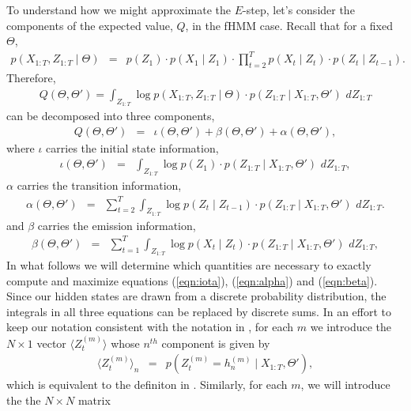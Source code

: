 \documentclass{amsart}
\begin{document}
To understand how we might approximate the $E$-step, let's consider the components of the expected value, $Q$, in the fHMM case.  Recall that for a fixed $\Theta$,  
\begin{eqnarray}\label{eqn:1}
p(X_{1:T},Z_{1:T}\mid \Theta) & = & p(Z_1)\cdot p(X_1\mid Z_1)\cdot 
\prod_{t=2}^Tp(X_t\mid Z_t)\cdot p(Z_t\mid Z_{t-1}).  
\end{eqnarray}
Therefore, 
\begin{eqnarray*}
Q(\Theta,\Theta') = \int_{Z_{1:T}}\log p(X_{1:T},Z_{1:T}\mid \Theta) 
\cdot p(Z_{1:T}\mid X_{1:T},\Theta')\,\,dZ_{1:T}
\end{eqnarray*}
can be decomposed into three components, 
\begin{eqnarray*}
Q(\Theta,\Theta') &=& \iota(\Theta,\Theta')+\beta(\Theta,\Theta')+\alpha(\Theta,\Theta'), 
\end{eqnarray*}
where $\iota$ carries the initial state information,
\begin{eqnarray}\label{eqn:iota}
\iota(\Theta,\Theta') &=& \int_{Z_{1:T}}\log p(Z_1)\cdot p(Z_{1:T}\mid 
X_{1:T},\Theta')\,\,dZ_{1:T},
\end{eqnarray}
$\alpha$ carries the transition information,
\begin{eqnarray}\label{eqn:alpha}
\alpha(\Theta,\Theta') &=& \sum_{t=2}^T\int_{Z_{1:T}}\log p(Z_t\mid 
Z_{t-1})\cdot p(Z_{1:T}\mid X_{1:T},\Theta')\,\,dZ_{1:T}.
\end{eqnarray}
and $\beta$ carries the emission information,
\begin{eqnarray}\label{eqn:beta}
\beta(\Theta,\Theta') &=& \sum_{t=1}^T\int_{Z_{1:T}}\log p(X_t\mid 
Z_t)\cdot p(Z_{1:T}\mid X_{1:T},\Theta')\,\,dZ_{1:T},
\end{eqnarray}
In what follows we will determine which quantities are necessary to exactly 
compute and maximize equations (\ref{eqn:iota}), (\ref{eqn:alpha}) and (\ref{eqn:beta}).  
Since our hidden states are drawn from a discrete probability distribution, the integrals 
in all three equations can be replaced by discrete sums.  In an effort 
to keep our notation consistent with the notation in \cite{GJ95}, for 
each $m$ we 
introduce the $N\times 1$ vector $\langle Z_t^{(m)}\rangle$ whose 
$n^{th}$ component is given by 
\begin{eqnarray*}
\langle Z_t^{(m)}\rangle_n &=& p\left(Z_t^{(m)}=h_n^{(m)}\mid 
X_{1:T},\Theta'\right),
\end{eqnarray*}
which is equivalent to the definiton in
\cite[Appendix B]{GJ95}. Similarly, for each $m$, we will introduce the the $N\times N$ matrix 
\end{document}

